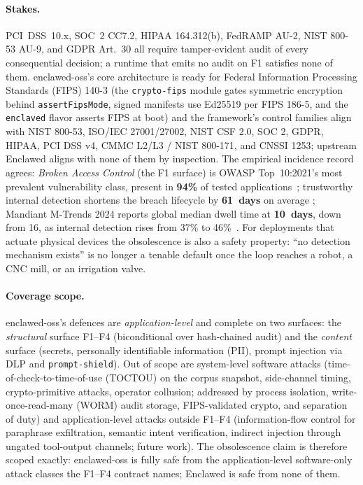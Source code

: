 \documentclass[11pt]{article}
\begin{document}
\paragraph{Stakes.} PCI~DSS~10.x, SOC~2 CC7.2, HIPAA 164.312(b),
FedRAMP AU-2, NIST 800-53 AU-9, and GDPR Art.~30 all require
tamper-evident audit of every consequential decision; a runtime that
emits no audit on F1 satisfies none of them. enclawed-oss's core
architecture is ready for Federal Information Processing Standards
(FIPS) 140-3 (the \texttt{crypto-fips} module gates symmetric
encryption behind \texttt{assertFipsMode}, signed manifests use
Ed25519 per FIPS 186-5, and the \texttt{enclaved} flavor asserts
FIPS at boot) and the framework's control families
align with NIST 800-53, ISO/IEC 27001/27002, NIST CSF 2.0, SOC 2,
GDPR, HIPAA, PCI DSS v4, CMMC L2/L3 / NIST 800-171, and CNSSI 1253;
upstream Enclawed aligns with none of them by inspection. The
empirical incidence record agrees: \emph{Broken Access Control}
(the F1 surface) is OWASP Top~10:2021's most prevalent
vulnerability class, present in \textbf{94\%} of tested
applications~\cite{OWASP_A01_2021}; trustworthy internal detection
shortens the breach lifecycle by \textbf{61~days} on average
\cite{IBM_CostOfBreach_2024}; Mandiant M-Trends 2024 reports
global median dwell time at \textbf{10~days}, down from 16, as
internal detection rises from 37\% to
46\%~\cite{Mandiant_MTrends_2024}. For deployments that actuate
physical devices the obsolescence is also a safety property: ``no
detection mechanism exists'' is no longer a tenable default once
the loop reaches a robot, a CNC mill, or an irrigation
valve.

\paragraph{Coverage scope.} enclawed-oss's defences are
\emph{application-level} and complete on two surfaces: the
\emph{structural} surface F1--F4 (biconditional over hash-chained
audit) and the \emph{content} surface (secrets, personally
identifiable information (PII), prompt injection via DLP and
\texttt{prompt-shield}). Out of scope are system-level software
attacks (time-of-check-to-time-of-use (TOCTOU) on the corpus
snapshot, side-channel timing, crypto-primitive attacks, operator
collusion; addressed by process isolation, write-once-read-many
(WORM) audit storage, FIPS-validated crypto, and separation of
duty) and application-level attacks outside F1--F4
(information-flow control for paraphrase exfiltration, semantic
intent verification, indirect injection through ungated tool-output
channels; future work). The obsolescence claim is therefore scoped
exactly: enclawed-oss is fully safe from the application-level
software-only attack classes the F1--F4 contract names; Enclawed is
safe from none of them.
\end{document}
